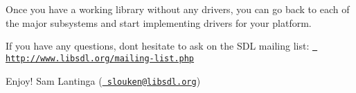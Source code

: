 Once you have a working library without any drivers, you can go back to each of the major subsystems and start implementing drivers for your platform.

If you have any questions, don\textquotesingle{}t hesitate to ask on the S\+DL mailing list\+: \href{http://www.libsdl.org/mailing-list.php}{\texttt{ http\+://www.\+libsdl.\+org/mailing-\/list.\+php}}

Enjoy! Sam Lantinga (\href{mailto:slouken@libsdl.org}{\texttt{ slouken@libsdl.\+org}}) 